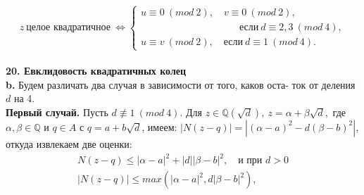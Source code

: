 $$ z~\text{целое квадратичное}~\Leftrightarrow 
\begin{cases}
u\equiv0~(mod~2),\quad v\equiv0~(mod~2),\\
\qquad\qquad\qquad\qquad\qquad \text{если}~d\equiv2,3~(mod~4),\\
u\equiv v~(mod~2),\quad \text{если}~d\equiv1~(mod~4).
\end{cases}$$
\\
\noindent\textbf{20. Евклидовость квадратичных колец} \newline 
\\
\hspace*{15pt}\textbf{b.} Будем различать два случая в зависимости от того, каков оста­-\linebreak
ток от деления $d$ на 4.\newline
\\
\hspace*{15pt}\textbf{Первый случай.} Пусть $d\not\equiv1~(mod~4)$. Для $z\in\mathbb{Q}(\sqrt{d}),~z=\alpha+\beta\sqrt{d},$\linebreak
где $\alpha,\beta\in\mathbb{Q}$ и $q\in A$ с $q=a+b\sqrt{d}$, имеем: $|N(z-q)|=|(\alpha-a)^2-d(\beta-b)^2|$,\linebreak
откуда извлекаем две оценки:
\begin{eqnarray*}
N(z-q)\leqslant|\alpha-a|^2+|d||\beta-b|^2,\quad\text{и при }d>0\\
|N(z-q)|\leqslant max(|\alpha-a|^2,d|\beta-b|^2),\qquad
\end{eqnarray*}

